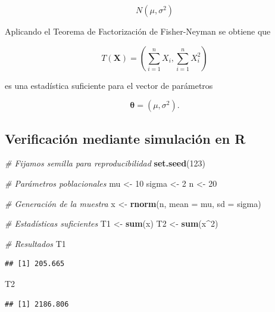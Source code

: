 \documentclass[
  11pt,
]{report}
\newenvironment{Shaded}{\begin{snugshade}}{\end{snugshade}}
\newcommand{\AttributeTok}[1]{\textcolor[rgb]{0.13,0.29,0.53}{#1}}
\newcommand{\CommentTok}[1]{\textcolor[rgb]{0.56,0.35,0.01}{\textit{#1}}}
\newcommand{\DecValTok}[1]{\textcolor[rgb]{0.00,0.00,0.81}{#1}}
\newcommand{\FunctionTok}[1]{\textcolor[rgb]{0.13,0.29,0.53}{\textbf{#1}}}
\newcommand{\NormalTok}[1]{#1}
\newcommand{\OtherTok}[1]{\textcolor[rgb]{0.56,0.35,0.01}{#1}}
\newcommand{\SpecialCharTok}[1]{\textcolor[rgb]{0.81,0.36,0.00}{\textbf{#1}}}
\begin{document}
\[N(\mu,\sigma^2)\]

Aplicando el Teorema de Factorización de Fisher-Neyman se obtiene que

\[T(\mathbf{X})=
\left(
\sum_{i=1}^{n}X_i,
\sum_{i=1}^{n}X_i^2
\right)\]

es una estadística suficiente para el vector de parámetros

\[\boldsymbol{\theta}=(\mu,\sigma^2).\]

\subsection{Verificación mediante simulación en
R}\label{verificaciuxf3n-mediante-simulaciuxf3n-en-r}

\begin{Shaded}
\begin{Highlighting}[]
\CommentTok{\# Fijamos semilla para reproducibilidad}
\FunctionTok{set.seed}\NormalTok{(}\DecValTok{123}\NormalTok{)}

\CommentTok{\# Parámetros poblacionales}
\NormalTok{mu }\OtherTok{\textless{}{-}} \DecValTok{10}
\NormalTok{sigma }\OtherTok{\textless{}{-}} \DecValTok{2}
\NormalTok{n }\OtherTok{\textless{}{-}} \DecValTok{20}

\CommentTok{\# Generación de la muestra}
\NormalTok{x }\OtherTok{\textless{}{-}} \FunctionTok{rnorm}\NormalTok{(n, }\AttributeTok{mean =}\NormalTok{ mu, }\AttributeTok{sd =}\NormalTok{ sigma)}

\CommentTok{\# Estadísticas suficientes}
\NormalTok{T1 }\OtherTok{\textless{}{-}} \FunctionTok{sum}\NormalTok{(x)}
\NormalTok{T2 }\OtherTok{\textless{}{-}} \FunctionTok{sum}\NormalTok{(x}\SpecialCharTok{\^{}}\DecValTok{2}\NormalTok{)}

\CommentTok{\# Resultados}
\NormalTok{T1}
\end{Highlighting}
\end{Shaded}

\begin{verbatim}
## [1] 205.665
\end{verbatim}

\begin{Shaded}
\begin{Highlighting}[]
\NormalTok{T2}
\end{Highlighting}
\end{Shaded}

\begin{verbatim}
## [1] 2186.806
\end{verbatim}
\end{document}
